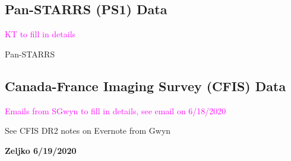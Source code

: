 \documentclass{aastex63}
\newcommand{\tbd}[1]{\textcolor{magenta}{#1}} %
\begin{document}
\subsection{Pan-STARRS (PS1) Data} \label{ssec:ps1}

\tbd{KT to fill in details}

Pan-STARRS \citep{2010SPIE.7733E..0EK}


\subsection{Canada-France Imaging Survey (CFIS) Data} \label{ssec:cfis}

\tbd{Emails from SGwyn to fill in details, see email on 6/18/2020}

See CFIS DR2 notes on Evernote from Gwyn
  






{\bf Zeljko 6/19/2020}

\end{document}
